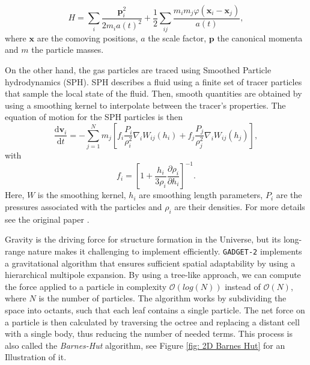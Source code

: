 \begin{equation}
        H=\sum_i\frac{\boldsymbol{p}_i^2}{2 m_i a(t)^2}+\frac12\sum_{ij}\frac{m_im_j \varphi(\boldsymbol{x}_i-\boldsymbol{x}_j)}{a(t)},
\end{equation}
where $\boldsymbol{x}$ are the comoving positions, $a$ the scale factor, $\boldsymbol{p}$ the canonical momenta and $m$ the particle masses.

On the other hand, the gas particles are traced using Smoothed Particle hydrodynamics (SPH). SPH describes a fluid using a finite set of tracer particles that sample the local state of the fluid. Then, smooth quantities are obtained by using a smoothing kernel to interpolate between the tracer's properties. The equation of motion for the SPH particles is then
\begin{equation}
        \frac{\mathrm{d}\boldsymbol{v}_i}{\mathrm{d}t}=-\sum_{j=1}^Nm_j\left[f_i\frac{P_i}{\rho_i^2}\nabla_iW_{ij}(h_i)+f_j\frac{P_j}{\rho_j^2}\nabla_iW_{ij}(h_j)\right],
\end{equation}
with
\begin{equation}
        f_i=\left[1+\frac{h_i}{3\rho_i}\frac{\partial\rho_i}{\partial h_i}\right]^{-1}.
\end{equation}
Here, $W$ is the smoothing kernel, $h_i$ are smoothing length parameters, $P_i$ are the pressures associated with the particles and $\rho_i$ are their densities. For more details see the original paper \cite{Springel_2005}.



Gravity is the driving force for structure formation in the Universe, but its long-range nature makes it challenging to implement efficiently. \texttt{GADGET-2} implements a gravitational algorithm that ensures sufficient spatial adaptability by using a hierarchical multipole expansion. By using a tree-like approach, we can compute the force applied to a particle in complexity $\mathcal{O}(log(N))$ instead of $\mathcal{O}(N)$, where $N$ is the number of particles. The algorithm works by subdividing the space into octants, such that each leaf contains a single particle. The net force on a particle is then calculated by traversing the octree and replacing a distant cell with a single body, thus reducing the number of needed terms. This process is also called the \emph{Barnes-Hut} algorithm, see Figure \ref{fig: 2D Barnes Hut} for an Illustration of it.

